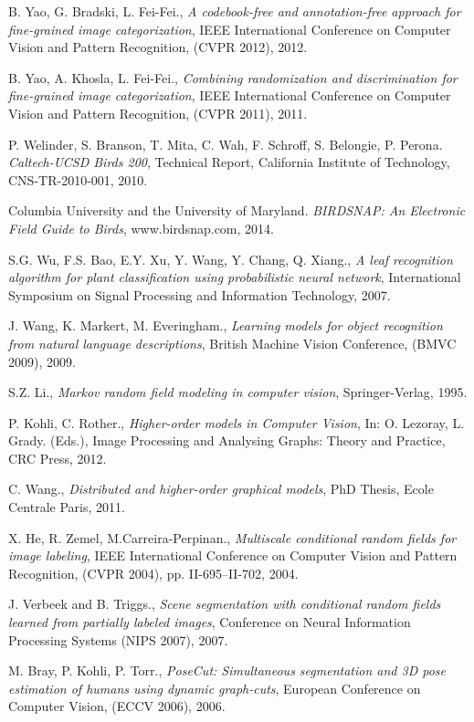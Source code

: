 \documentclass{article}
\begin{document}
\begin{thebibliography}{100}
B. Yao, G. Bradski, L. Fei-Fei., \emph{A codebook-free and annotation-free approach for fine-grained image categorization}, IEEE International Conference on Computer Vision and Pattern Recognition, (CVPR 2012), 2012. 

B. Yao, A. Khosla, L. Fei-Fei., \emph{Combining randomization and discrimination for fine-grained image categorization}, IEEE International Conference on Computer Vision and Pattern Recognition, (CVPR 2011), 2011. 

P. Welinder, S. Branson, T. Mita, C. Wah, F. Schroff, S. Belongie, P. Perona. \emph{Caltech-UCSD Birds 200}, Technical Report, California Institute of Technology, CNS-TR-2010-001, 2010. 

Columbia University and the University of Maryland. \emph{BIRDSNAP: An Electronic Field Guide to Birds}, www.birdsnap.com, 2014. 

S.G. Wu, F.S. Bao, E.Y. Xu, Y. Wang, Y. Chang, Q. Xiang., \emph{A leaf recognition algorithm for plant classification using probabilistic neural network}, International Symposium on Signal Processing and Information Technology, 2007. 

J. Wang, K. Markert, M. Everingham., \emph{Learning models for object recognition from natural language descriptions}, British Machine Vision Conference, (BMVC 2009), 2009. 

S.Z. Li., \emph{Markov random field modeling in computer vision}, Springer-Verlag, 1995. 

P. Kohli, C. Rother., \emph{Higher-order models in Computer Vision}, In: O. Lezoray, L. Grady. (Eds.), Image Processing and Analysing Graphs: Theory and Practice, CRC Press, 2012. 

C. Wang., \emph{Distributed and higher-order graphical models}, PhD Thesis, Ecole Centrale Paris, 2011.

X. He, R. Zemel, M.Carreira-Perpinan., \emph{Multiscale conditional random fields for image labeling}, IEEE International Conference on Computer Vision and Pattern Recognition, (CVPR 2004), pp. II-695--II-702, 2004. 

J. Verbeek and B. Triggs., \emph{Scene segmentation with conditional random fields learned from partially labeled images}, Conference on Neural Information Processing Systems (NIPS 2007), 2007. 

M. Bray, P. Kohli, P. Torr., \emph{PoseCut: Simultaneous segmentation and 3D pose estimation of humans using dynamic graph-cuts}, European Conference on Computer Vision, (ECCV 2006), 2006. 


\end{thebibliography}
\end{document}
